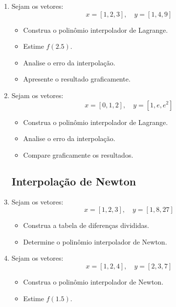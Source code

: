 \begin{enumerate}[label=\thesection.\arabic*]
\subsection*{Interpolação de Lagrange}

\item Sejam os vetores:
\[
x = [1, 2, 3], \quad y = [1, 4, 9]
\]

\begin{itemize}
    \item Construa o polinômio interpolador de Lagrange.
    \item Estime $f(2.5)$.
    \item Analise o erro da interpolação.
    \item Apresente o resultado graficamente.
\end{itemize}

\item Sejam os vetores:
\[
x = [0, 1, 2], \quad y = [1, e, e^2]
\]

\begin{itemize}
    \item Construa o polinômio interpolador de Lagrange.
    \item Analise o erro da interpolação.
    \item Compare graficamente os resultados.
\end{itemize}

\subsection*{Interpolação de Newton}

\item Sejam os vetores:
\[
x = [1, 2, 3], \quad y = [1, 8, 27]
\]

\begin{itemize}
    \item Construa a tabela de diferenças divididas.
    \item Determine o polinômio interpolador de Newton.
\end{itemize}

\item Sejam os vetores:
\[
x = [1, 2, 4], \quad y = [2, 3, 7]
\]

\begin{itemize}
    \item Construa o polinômio interpolador de Newton.
    \item Estime $f(1.5)$.
\end{itemize}


\end{enumerate}
